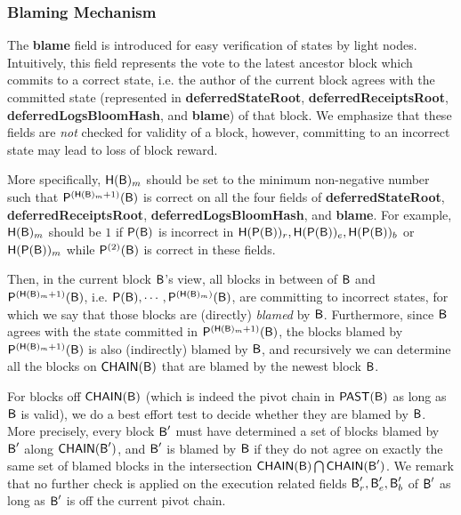 \subsubsection{Blaming Mechanism}
\label{sec:blaming}
	
	The {\bf blame} field is introduced for easy verification of states by light nodes.
	Intuitively, this field represents the vote to the latest ancestor block which commits to a correct state, 
	i.e. the author of the current block agrees with the committed state (represented in {\bf deferredStateRoot}, {\bf deferredReceiptsRoot}, {\bf deferredLogsBloomHash}, and {\bf blame}) of that block.
	We emphasize that these fields are \emph{not} checked for validity of a block, however, committing to an incorrect state may lead to loss of block reward.



	More specifically, $\textsf{H}(\textsf{B})_{m}$ should be set to the minimum non-negative number such that $\mathsf{P}^{\left(\textsf{H}(\textsf{B})_{m}+1\right)}(\textsf{B})$ is correct on all the four fields of {\bf deferredStateRoot}, {\bf deferredReceiptsRoot}, {\bf deferredLogsBloomHash}, and {\bf blame}.
	For example, $\textsf{H}(\textsf{B})_{m}$ should be $1$ if $\mathsf{P}{\left({\textsf{B}} \right)}$ is incorrect in $\textsf{H}(\mathsf{P}{\left({\textsf{B}} \right)})_{r}, \textsf{H}(\mathsf{P}{\left({\textsf{B}} \right)})_{e}, \textsf{H}(\mathsf{P}{\left({\textsf{B}} \right)})_{b}$ or $\textsf{H}(\mathsf{P}{\left({\textsf{B}} \right)})_{m}$ while $\mathsf{P}^{(2)}(\textsf{B})$ is correct in these fields.

	Then, in the current block $\textsf{B}$'s view, all blocks in between of $\textsf{B}$ and $\mathsf{P}^{\left(\textsf{H}(\textsf{B})_{m}+1\right)}(\textsf{B})$, i.e. $\mathsf{P}(\textsf{B}), \cdots, \mathsf{P}^{\left(\textsf{H}(\textsf{B})_{m}\right)}(\textsf{B})$, are committing to incorrect states, for which we say that those blocks are (directly) \emph{blamed} by $\textsf{B}$.
	Furthermore, since $\textsf{B}$ agrees with the state committed in $\mathsf{P}^{\left(\textsf{H}(\textsf{B})_{m}+1\right)}(\textsf{B})$,
	the blocks blamed by $\mathsf{P}^{\left(\textsf{H}(\textsf{B})_{m}+1\right)}(\textsf{B})$ is also (indirectly) blamed by $\textsf{B}$, and recursively we can determine all the blocks on $\mathsf{CHAIN}(\textsf{B})$ that are blamed by the newest block $\textsf{B}$.

	For blocks off $\mathsf{CHAIN}(\textsf{B})$ (which is indeed the pivot chain in $\mathsf{PAST}(\textsf{B})$ as long as $\textsf{B}$ is valid), 
	we do a best effort test to decide whether they are blamed by $\textsf{B}$.
	More precisely,
	every block $\textsf{B}'$ must have determined a set of blocks blamed by $\textsf{B}'$ along $\mathsf{CHAIN}(\textsf{B}')$,
	and $\textsf{B}'$ is blamed by $\textsf{B}$ if they do not agree on exactly the same set of blamed blocks in the intersection $\mathsf{CHAIN}(\textsf{B})\bigcap\mathsf{CHAIN}(\textsf{B}')$.
	We remark that no further check is applied on the execution related fields $\textsf{B}'_r,\textsf{B}'_e,\textsf{B}'_b$ of $\textsf{B}'$ as long as $\textsf{B}'$ is off the current pivot chain.

